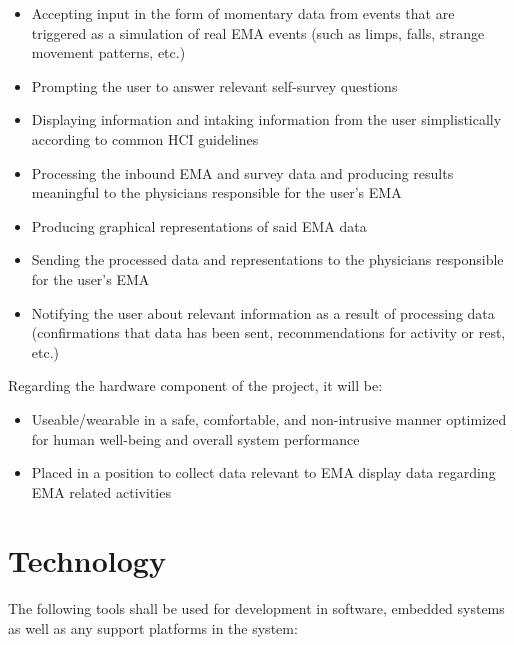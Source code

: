 \documentclass{article}
\begin{document}
\begin{itemize}
\item Accepting input in the form of momentary data from events that are triggered as a simulation of real EMA events (such as limps, falls, strange movement patterns, etc.)
\item Prompting the user to answer relevant self-survey questions
\item Displaying information and intaking information from the user simplistically according to common HCI guidelines
\item Processing the inbound EMA and survey data and producing results meaningful to the physicians responsible for the user's EMA
\item Producing graphical representations of said EMA data
\item Sending the processed data and representations to the physicians responsible for the user's EMA
\item Notifying the user about relevant information as a result of processing data (confirmations that data has been sent, recommendations for activity or rest, etc.)
\end{itemize}

Regarding the hardware component of the project, it will be:\\

\begin{itemize}
\item Useable/wearable in a safe, comfortable, and non-intrusive manner optimized for human well-being and overall system performance
\item Placed in a position to collect data relevant to EMA display data regarding EMA related activities
\end{itemize}

\section{Technology}
The following tools shall be used for development in software, embedded systems as well as any support platforms in the system:
\end{document}
